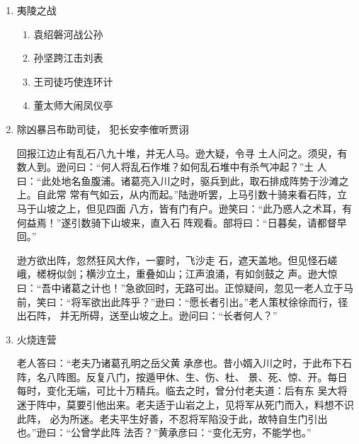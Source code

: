 \documentclass[UTF8,12pt,twoside,a4paper]{ctexart} %
\begin{document}
\begin{flushleft}

\begin{enumerate}

\heiti {} \item  夷陵之战
	
	\begin{enumerate}[(1)] %
\songti
\item  	袁绍磐河战公孙 
\item   孙坚跨江击刘表
\item  	王司徒巧使连环计 
\item   董太师大闹凤仪亭
	\end{enumerate}

\heiti {} \item  	除凶暴吕布助司徒， 犯长安李傕听贾诩

\songti {}
\indent\setlength{\parindent}{2em}%
\hspace{1.6em}
回报江边止有乱石八九十堆，并无人马。逊大疑，令寻
土人问之。须臾，有数人到。逊问曰：“何人将乱石作堆？如何乱石堆中有杀气冲起？”土
人曰：“此处地名鱼腹浦。诸葛亮入川之时，驱兵到此，取石排成阵势于沙滩之上。自此常
常有气如云，从内而起。”陆逊听罢，上马引数十骑来看石阵，立马于山坡之上，但见四面
八方，皆有门有户。逊笑曰：“此乃惑人之术耳，有何益焉！”遂引数骑下山坡来，直入石
阵观看。部将曰：“日暮矣，请都督早回。”

逊方欲出阵，忽然狂风大作，一霎时，飞沙走
石，遮天盖地。但见怪石嵯峨，槎枒似剑；横沙立土，重叠如山；江声浪涌，有如剑鼓之
声。逊大惊曰：“吾中诸葛之计也！”急欲回时，无路可出。正惊疑间，忽见一老人立于马
前，笑曰：“将军欲出此阵乎？”逊曰：“愿长者引出。”老人策杖徐徐而行，径出石阵，
并无所碍，送至山坡之上。逊问曰：“长者何人？”



\heiti {} \item  火烧连营

\songti {}
\indent\setlength{\parindent}{2em}%
老人答曰：“老夫乃诸葛孔明之岳父黄
承彦也。昔小婿入川之时，于此布下石阵，名八阵图。反复八门，按遁甲休、生、伤、杜、
景、死、惊、开。每日每时，变化无端，可比十万精兵。临去之时，曾分付老夫道：后有东
吴大将迷于阵中，莫要引他出来。老夫适于山岩之上，见将军从死门而入，料想不识此阵，
必为所迷。老夫平生好善，不忍将军陷没于此，故特自生门引出也。”逊曰：“公曾学此阵
法否？”黄承彦曰：“变化无穷，不能学也。”


\end{enumerate}
\end{flushleft}
\end{document}
